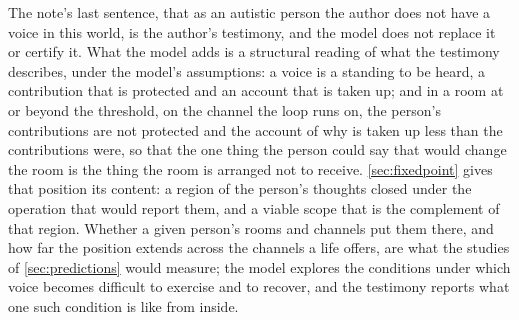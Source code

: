 
The note's last sentence, that as an autistic person the author does not have a voice in this world, is the author's testimony, and the model does not replace it or certify it. What the model adds is a structural reading of what the testimony describes, under the model's assumptions: a voice is a standing to be heard, a contribution that is protected and an account that is taken up; and in a room at or beyond the threshold, on the channel the loop runs on, the person's contributions are not protected and the account of why is taken up less than the contributions were, so that the one thing the person could say that would change the room is the thing the room is arranged not to receive. \autoref{sec:fixedpoint} gives that position its content: a region of the person's thoughts closed under the operation that would report them, and a viable scope that is the complement of that region. Whether a given person's rooms and channels put them there, and how far the position extends across the channels a life offers, are what the studies of \autoref{sec:predictions} would measure; the model explores the conditions under which voice becomes difficult to exercise and to recover, and the testimony reports what one such condition is like from inside.

